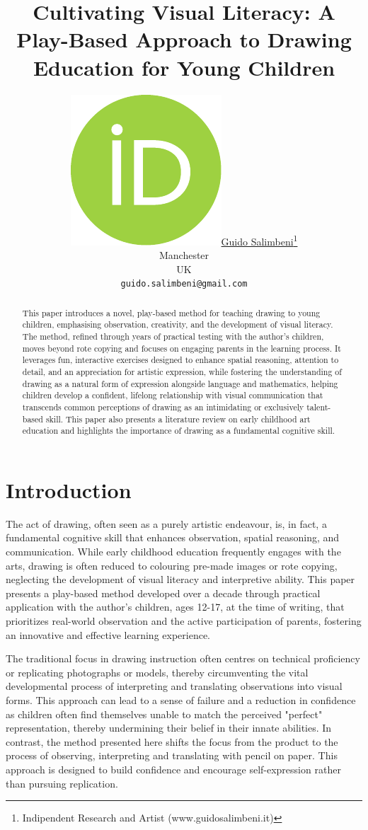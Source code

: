 \documentclass{article}
\title{Cultivating Visual Literacy: A Play-Based Approach to Drawing Education for Young Children}
\author{ \href{https://orcid.org/0000-0001-6666-3518}{\includegraphics[scale=0.06]{orcid.pdf}\hspace{1mm}Guido Salimbeni}\thanks{Indipendent Research and Artist (www.guidosalimbeni.it)} \\
	Manchester\\
	UK \\
	\texttt{guido.salimbeni@gmail.com} \\
}
\begin{document}
\maketitle

\begin{abstract}
This paper introduces a novel, play-based method for teaching drawing to young children, emphasising observation, creativity, and the development of visual literacy. The method, refined through years of practical testing with the author's children, moves beyond rote copying and focuses on engaging parents in the learning process. It leverages fun, interactive exercises designed to enhance spatial reasoning, attention to detail, and an appreciation for artistic expression, while fostering the understanding of drawing as a natural form of expression alongside language and mathematics, helping children develop a confident, lifelong relationship with visual communication that transcends common perceptions of drawing as an intimidating or exclusively talent-based skill. This paper also presents a literature review on early childhood art education and highlights the importance of drawing as a fundamental cognitive skill.
\end{abstract}




\section{Introduction}
The act of drawing, often seen as a purely artistic endeavour, is, in fact, a fundamental cognitive skill that enhances observation, spatial reasoning, and communication. While early childhood education frequently engages with the arts, drawing is often reduced to colouring pre-made images or rote copying, neglecting the development of visual literacy and interpretive ability. This paper presents a play-based method developed over a decade through practical application with the author's children, ages 12-17, at the time of writing, that prioritizes real-world observation and the active participation of parents, fostering an innovative and effective learning experience.

The traditional focus in drawing instruction often centres on technical proficiency or replicating photographs or models, thereby circumventing the vital developmental process of interpreting and translating observations into visual forms. This approach can lead to a sense of failure and a reduction in confidence as children often find themselves unable to match the perceived "perfect" representation, thereby undermining their belief in their innate abilities. In contrast, the method presented here shifts the focus from the product to the process of observing, interpreting and translating with pencil on paper. This approach is designed to build confidence and encourage self-expression rather than pursuing replication.
\end{document}
